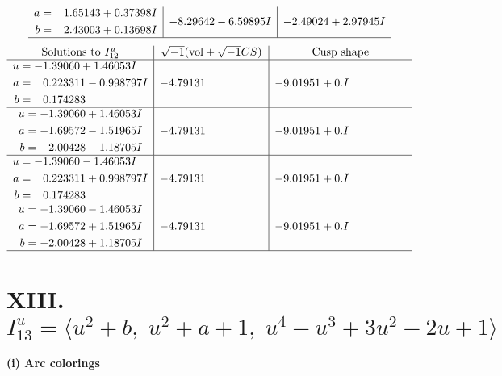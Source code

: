\documentclass[1p]{elsarticle_modified}
\theoremstyle{definition}
\newcommand{\I}{\sqrt{-1}}
\begin{document}
$$\begin{array}{c|c|c}
\begin{aligned}
a &= \phantom{-}1.65143 + 0.37398 I \\
b &= \phantom{-}2.43003 + 0.13698 I\end{aligned}
 & -8.29642 - 6.59895 I & -2.49024 + 2.97945 I\\
 \hline 
 \end{array}$$\newpage$$\begin{array}{c|c|c}  
\text{Solutions to }I^u_{12}& \I (\text{vol} + \sqrt{-1}CS) & \text{Cusp shape}\\
 \hline 
\begin{aligned}
u &= -1.39060 + 1.46053 I \\
a &= \phantom{-}0.223311 - 0.998797 I \\
b &= \phantom{-}0.174283\phantom{ +0.000000I}\end{aligned}
 & -4.79131\phantom{ +0.000000I} & -9.01951 + 0. I\phantom{ +0.000000I} \\ \hline\begin{aligned}
u &= -1.39060 + 1.46053 I \\
a &= -1.69572 - 1.51965 I \\
b &= -2.00428 - 1.18705 I\end{aligned}
 & -4.79131\phantom{ +0.000000I} & -9.01951 + 0. I\phantom{ +0.000000I} \\ \hline\begin{aligned}
u &= -1.39060 - 1.46053 I \\
a &= \phantom{-}0.223311 + 0.998797 I \\
b &= \phantom{-}0.174283\phantom{ +0.000000I}\end{aligned}
 & -4.79131\phantom{ +0.000000I} & -9.01951 + 0. I\phantom{ +0.000000I} \\ \hline\begin{aligned}
u &= -1.39060 - 1.46053 I \\
a &= -1.69572 + 1.51965 I \\
b &= -2.00428 + 1.18705 I\end{aligned}
 & -4.79131\phantom{ +0.000000I} & -9.01951 + 0. I\phantom{ +0.000000I}\\
 \hline 
 \end{array}$$\newpage\newpage\renewcommand{\arraystretch}{1}
\centering \section*{XIII. $I^u_{13}= \langle u^2+b,\;u^2+a+1,\;u^4- u^3+3 u^2-2 u+1 \rangle$}
\flushleft \textbf{(i) Arc colorings}\\
\end{document}
